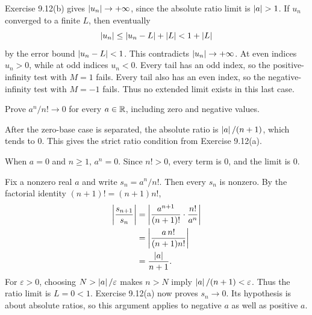 Exercise 9.12(b) gives $\left|u_n\right|\to+\infty$, since
the absolute ratio limit is $\abs a>1$.
If $u_n$ converged to a finite $L$, then eventually
\[
 \left|u_n\right|\leq\left|u_n-L\right|+\left|L\right|<1+\left|L\right|
\]
by the error bound $\left|u_n-L\right|<1$. This contradicts
$\left|u_n\right|\to+\infty$.
At even indices $u_n>0$, while at odd indices $u_n<0$.
Every tail has an odd index, so the positive-infinity test
with $M=1$ fails. Every tail also has an even index, so
the negative-infinity test with $M=-1$ fails.
Thus no extended limit exists in this last case.



\goal Prove $a^n/n!\to0$ for every $a\in\mathbb{R}$, including
zero and negative values.

\idea After the zero-base case is separated, the absolute
ratio is $\left|a\right|/(n+1)$, which tends to $0$. This gives
the strict ratio condition from Exercise 9.12(a).

When $a=0$ and $n\geq1$, $a^n=0$. Since $n!>0$,
every term is $0$, and the limit is $0$.

Fix a nonzero real $a$ and write $s_n=a^n/n!$.
Then every $s_n$ is nonzero. By the factorial identity
$(n+1)!=(n+1)n!$,
\begin{align*}
 \left|\frac{s_{n+1}}{s_n}\right|
 &=\left|\frac{a^{n+1}}{(n+1)!}\cdot\frac{n!}{a^n}\right|\\
 &=\left|\frac{a\,n!}{(n+1)n!}\right|\\
 &=\frac{\left|a\right|}{n+1}.
\end{align*}
For $\varepsilon>0$, choosing $N>\left|a\right|/\varepsilon$
makes $n>N$ imply $\left|a\right|/(n+1)<\varepsilon$.
Thus the ratio limit is $L=0<1$.
Exercise 9.12(a) now proves $s_n\to0$. Its hypothesis is
about absolute ratios, so this argument applies to negative
$a$ as well as positive $a$.


